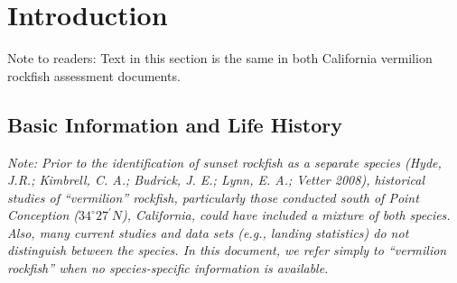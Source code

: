 \documentclass[11pt,
  english,
]{article}
\begin{document}
\pagebreak
\setlength{\parskip}{5mm plus1mm minus1mm}
\setcounter{page}{1}
\renewcommand{\thefigure}{\arabic{figure}}
\renewcommand{\thetable}{\arabic{table}}
\setcounter{table}{0}
\setcounter{figure}{0}


\hypertarget{introduction}{%
\section{Introduction}\label{introduction}}

\leavevmode\tagmcend\tagstructend

Note to readers: Text in this section is the same in both California vermilion rockfish assessment documents.


\hypertarget{basic-information-and-life-history}{%
\subsection{Basic Information and Life History}\label{basic-information-and-life-history}}

\leavevmode\tagmcend\tagstructend

\emph{Note: Prior to the identification of sunset rockfish as a separate species {(Hyde, J.R.; Kimbrell, C. A.; Budrick, J. E.; Lynn, E. A.; Vetter 2008)\leavevmode\tagmcend\tagstructend}, historical studies of ``vermilion'' rockfish, particularly those conducted south of Point Conception ($34^\circ 27^\prime N$), California, could have included a mixture of both species. Also, many current studies and data sets (e.g., landing statistics) do not distinguish between the species. In this document, we refer simply to ``vermilion rockfish'' when no species-specific information is available.}
\end{document}
